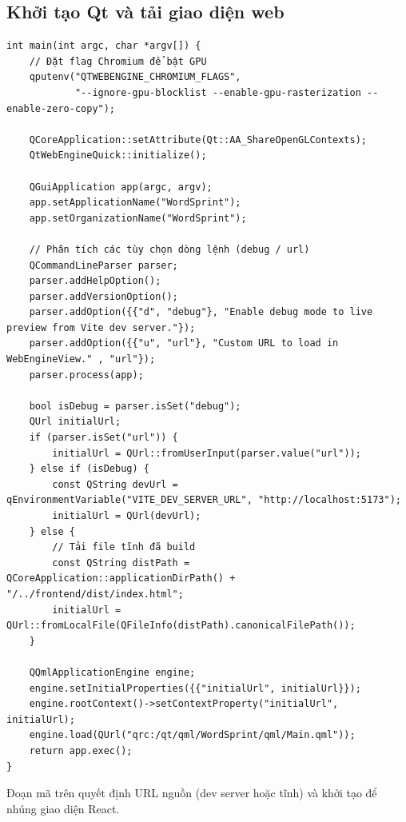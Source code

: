\subsection{Khởi tạo Qt và tải giao diện web}
\label{subsec:qt_init}
\begin{lstlisting}[caption={main.cpp – khởi tạo Qt và WebEngineView}, label={lst:main_cpp}]
int main(int argc, char *argv[]) {
    // Đặt flag Chromium để bật GPU
    qputenv("QTWEBENGINE_CHROMIUM_FLAGS",
            "--ignore-gpu-blocklist --enable-gpu-rasterization --enable-zero-copy");

    QCoreApplication::setAttribute(Qt::AA_ShareOpenGLContexts);
    QtWebEngineQuick::initialize();

    QGuiApplication app(argc, argv);
    app.setApplicationName("WordSprint");
    app.setOrganizationName("WordSprint");

    // Phân tích các tùy chọn dòng lệnh (debug / url)
    QCommandLineParser parser;
    parser.addHelpOption();
    parser.addVersionOption();
    parser.addOption({{"d", "debug"}, "Enable debug mode to live preview from Vite dev server."});
    parser.addOption({{"u", "url"}, "Custom URL to load in WebEngineView." , "url"});
    parser.process(app);

    bool isDebug = parser.isSet("debug");
    QUrl initialUrl;
    if (parser.isSet("url")) {
        initialUrl = QUrl::fromUserInput(parser.value("url"));
    } else if (isDebug) {
        const QString devUrl = qEnvironmentVariable("VITE_DEV_SERVER_URL", "http://localhost:5173");
        initialUrl = QUrl(devUrl);
    } else {
        // Tải file tĩnh đã build
        const QString distPath = QCoreApplication::applicationDirPath() + "/../frontend/dist/index.html";
        initialUrl = QUrl::fromLocalFile(QFileInfo(distPath).canonicalFilePath());
    }

    QQmlApplicationEngine engine;
    engine.setInitialProperties({{"initialUrl", initialUrl}});
    engine.rootContext()->setContextProperty("initialUrl", initialUrl);
    engine.load(QUrl("qrc:/qt/qml/WordSprint/qml/Main.qml"));
    return app.exec();
}
\end{lstlisting}
Đoạn mã trên quyết định URL nguồn (dev server hoặc tĩnh) và khởi tạo  để nhúng giao diện React.


